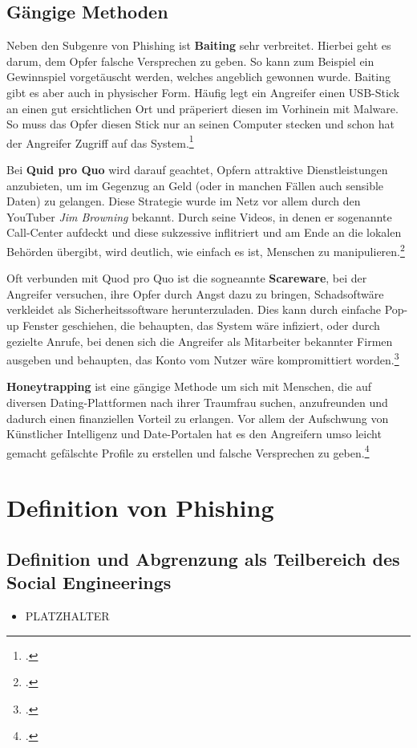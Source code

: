 \documentclass[12pt, a4paper, oneside]{scrartcl}
\begin{document}
\subsection{Gängige Methoden}
Neben den Subgenre von Phishing ist \textbf{Baiting} sehr verbreitet.
Hierbei geht es darum, dem Opfer falsche Versprechen zu geben. So kann zum Beispiel ein Gewinnspiel vorgetäuscht werden,
welches angeblich gewonnen wurde. Baiting gibt es aber auch in physischer Form. Häufig legt ein Angreifer einen USB-Stick
an einen gut ersichtlichen Ort und präperiert diesen im Vorhinein mit Malware. So muss das Opfer diesen 
Stick nur an seinen Computer stecken und schon hat der Angreifer Zugriff auf das System.\footcite{CS_10Arten}
\par
Bei \textbf{Quid pro Quo} wird darauf geachtet, Opfern attraktive Dienstleistungen anzubieten, um im Gegenzug
an Geld (oder in manchen Fällen auch sensible Daten) zu gelangen. Diese Strategie wurde im Netz vor allem durch den YouTuber \textit{Jim Browning} bekannt.
Durch seine Videos, in denen er sogenannte Call-Center aufdeckt und diese sukzessive inflitriert und
am Ende an die lokalen Behörden übergibt, wird deutlich, wie einfach es ist, Menschen zu manipulieren.\footcite{JB_YouTube}
\par
Oft verbunden mit Quod pro Quo ist die sogneannte \textbf{Scareware}, bei der Angreifer versuchen, ihre Opfer 
durch Angst dazu zu bringen, Schadsoftwäre verkleidet als Sicherheitssoftware herunterzuladen. Dies kann 
durch einfache Pop-up Fenster geschiehen, die behaupten, das System wäre infiziert, oder durch gezielte
Anrufe, bei denen sich die Angreifer als Mitarbeiter bekannter Firmen ausgeben und behaupten, das Konto
vom Nutzer wäre kompromittiert worden.\footcite{Keeper_Scareware}
\par
\textbf{Honeytrapping} ist eine gängige Methode um sich mit Menschen, die auf diversen Dating-Plattformen nach
ihrer Traumfrau suchen, anzufreunden und dadurch einen finanziellen Vorteil zu erlangen. Vor allem 
der Aufschwung von Künstlicher Intelligenz und Date-Portalen hat es den Angreifern umso leicht gemacht
gefälschte Profile zu erstellen und falsche Versprechen zu geben.\footcite{CS_10Arten}

\section{Definition von Phishing}

\subsection{Definition und Abgrenzung als Teilbereich des Social Engineerings}
\begin{itemize}
  \item PLATZHALTER
\end{itemize}
\end{document}
